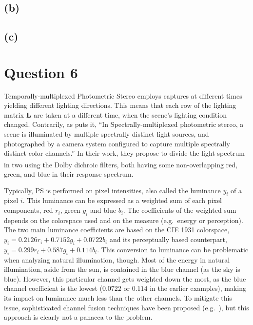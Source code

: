 \documentclass{report}
\begin{document}
\subsection{(b)}



\subsection{(c)}
\section{Question 6}

Temporally-multiplexed Photometric Stereo employs captures at different times yielding different lighting directions. This means that each row of the lighting matrix $\mathbf{L}$ are taken at a different time, when the scene's lighting condition changed. Contrarily, as \cite{Fyffe2011} puts it, ``In Spectrally-multiplexed photometric stereo, a scene is illuminated by multiple spectrally distinct light sources, and photographed by a camera system configured to capture multiple spectrally distinct color channels.'' In their work, they propose to divide the light spectrum in two using the Dolby\textsuperscript{\textregistered} dichroic filters, both having some non-overlapping red, green, and blue in their response spectrum.

Typically, PS is performed on pixel intensities, also called the luminance $y_i$ of a pixel $i$. This luminance can be expressed as a weighted sum of each pixel components, red $r_i$, green $g_i$ and blue $b_i$. The coefficients of the weighted sum depends on the colorspace used and on the measure (e.g.\ energy or perception). The two main luminance coefficients are based on the CIE 1931 colorspace, $y_i = 0.2126r_i + 0.7152g_i + 0.0722b_i$ and its perceptually based counterpart, $y_i = 0.299r_i + 0.587g_i + 0.114b_i$. This conversion to luminance can be problematic when analyzing natural illumination, though. Most of the energy in natural illumination, aside from the sun, is contained in the blue channel (as the sky is blue). However, this particular channel gets weighted down the most, as the blue channel coefficient is the lowest ($0.0722$ or $0.114$ in the earlier examples), making its impact on luminance much less than the other channels. To mitigate this issue, sophisticated channel fusion techniques have been proposed (e.g.\ \cite{jung-cvpr-15}), but this approach is clearly not a panacea to the problem.
\end{document}
